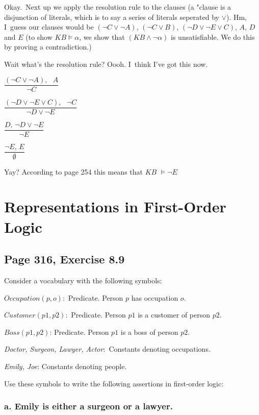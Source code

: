 \documentclass{article}
\begin{document}
Okay.\ Next up we apply the resolution rule to the clauses (a "clause is a
disjunction of literals, which is to say a series of literals seperated by $%
\vee $). Hm, I\ guess our clauses would be $\left( \lnot C\vee \lnot
A\right) $, $\left( \lnot C\vee B\right) $, $\left( \lnot D\vee \lnot E\vee
C\right) $, $A$, $D$ and $E$ (to show $KB\models \alpha $, we show that $%
\left( KB\wedge \lnot \alpha \right) $ is unsatisfiable. We do this by
proving a contradiction.)

Wait what's the resolution rule? Oooh. I\ think I've got this now.

$\dfrac{\left( \lnot C\vee \lnot A\right) ,\text{ }A}{\lnot C}$

$\dfrac{\left( \lnot D\vee \lnot E\vee C\right) ,\text{ }\lnot C}{\lnot
D\vee \lnot E}$

$\dfrac{D\text{, }\lnot D\vee \lnot E}{\lnot E}$

$\dfrac{\lnot E\text{, }E}{\emptyset }$

Yay? According to page 254 this means that $KB$ $\models \lnot E$

\section{Representations in First-Order Logic}

\subsection{Page 316, Exercise 8.9}

Consider a vocabulary with the following symbols:

$Occupation(p,o)$:\ Predicate. Person $p$ has occupation $o$.

$Customer\left( p1,p2\right) $:\ Predicate. Person $p1$ is a customer of
person $p2$.

$Boss\left( p1,p2\right) $: Predicate. Person $p1$ is a boss of person $p2$.

\textit{Doctor, Surgeon, Lawyer, Actor}:\textit{\ }Constants denoting
occupations.

\textit{Emily, Joe}: Constants denoting people.

Use these symbols to write the following assertions in first-order logic:

\subsubsection{a. Emily is either a surgeon or a lawyer.}
\end{document}

